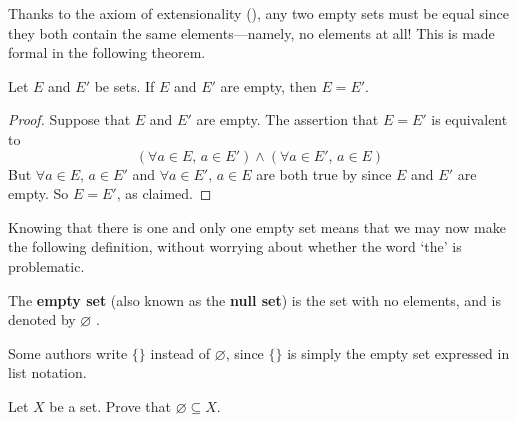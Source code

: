 Thanks to the axiom of extensionality (), any two empty sets must be equal since they both contain the same elements---namely, no elements at all! This is made formal in the following theorem.

\begin{theorem}
\label{thmEmptySetIsUnique}
Let $E$ and $E'$ be sets. If $E$ and $E'$ are empty, then $E=E'$.
\end{theorem}
\begin{proof}
Suppose that $E$ and $E'$ are empty. The assertion that $E=E'$ is equivalent to
\[ (\forall a \in E,\, a \in E') \wedge (\forall a \in E',\, a \in E) \]
But $\forall a \in E,\, a \in E'$ and $\forall a \in E',\, a \in E$ are both true by  since $E$ and $E'$ are empty. So $E=E'$, as claimed.
\end{proof}

Knowing that there is one and only one empty set means that we may now make the following definition, without worrying about whether the word `the' is problematic.

\begin{definition}
\label{defEmptySet}
The \textbf{empty set} (also known as the \textbf{null set}) is the set with no elements, and is denoted by $\varnothing$ .
\end{definition}

Some authors write $\{ \}$ instead of $\varnothing$, since $\{ \}$ is simply the empty set expressed in list notation.

\begin{exercise}
\label{exEmptySetSubsetOfEverySet}
Let $X$ be a set. Prove that $\varnothing \subseteq X$.
\end{exercise}

